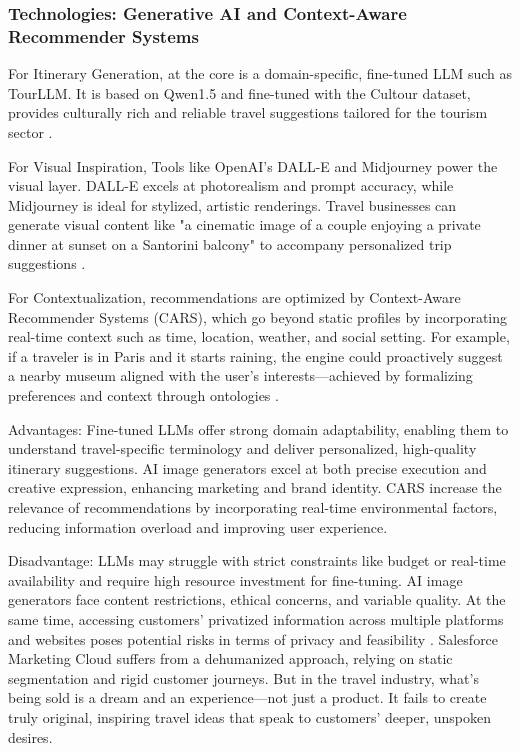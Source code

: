 \subsubsection{Technologies: Generative AI and Context-Aware Recommender Systems}

For Itinerary Generation, at the core is a domain-specific, fine-tuned LLM such as TourLLM. It is based on Qwen1.5 and fine-tuned with the Cultour dataset, provides culturally rich and reliable travel suggestions tailored for the tourism sector \cite{wei2024tourllm}.

For Visual Inspiration, Tools like OpenAI's DALL-E and Midjourney power the visual layer. DALL-E excels at photorealism and prompt accuracy, while Midjourney is ideal for stylized, artistic renderings. Travel businesses can generate visual content like "a cinematic image of a couple enjoying a private dinner at sunset on a Santorini balcony" to accompany personalized trip suggestions \cite{Yildirim2023}.

For Contextualization, recommendations are optimized by Context-Aware Recommender Systems (CARS), which go beyond static profiles by incorporating real-time context such as time, location, weather, and social setting. For example, if a traveler is in Paris and it starts raining, the engine could proactively suggest a nearby museum aligned with the user's interests—achieved by formalizing preferences and context through ontologies \cite{raza2019progress}.

Advantages: Fine-tuned LLMs offer strong domain adaptability, enabling them to understand travel-specific terminology and deliver personalized, high-quality itinerary suggestions. AI image generators excel at both precise execution and creative expression, enhancing marketing and brand identity. CARS increase the relevance of recommendations by incorporating real-time environmental factors, reducing information overload and improving user experience.

Disadvantage: LLMs may struggle with strict constraints like budget or real-time availability and require high resource investment for fine-tuning. AI image generators face content restrictions, ethical concerns, and variable quality. At the same time, accessing customers' privatized information across multiple platforms and websites poses potential risks in terms of privacy and feasibility \cite{Badhan2024}. Salesforce Marketing Cloud suffers from a dehumanized approach, relying on static segmentation and rigid customer journeys. But in the travel industry, what's being sold is a dream and an experience—not just a product. It fails to create truly original, inspiring travel ideas that speak to customers' deeper, unspoken desires.
